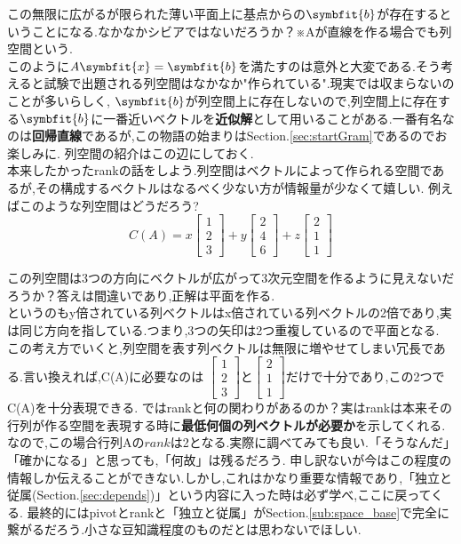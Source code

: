 この無限に広がるが限られた薄い平面上に基点からの$\symbfit{b}$が存在するということになる.なかなかシビアではないだろうか？※Aが直線を作る場合でも列空間という.\\
このように$A\symbfit{x}=\symbfit{b}$を満たすのは意外と大変である.そう考えると試験で出題される列空間はなかなか"作られている".現実では収まらないのことが多いらしく,
$\symbfit{b}$が列空間上に存在しないので,列空間上に存在する$\symbfit{b}$に一番近いベクトルを\textbf{近似解}として用いることがある.一番有名なのは\textbf{回帰直線}であるが,この物語の始まりはSection.\ref{sec:startGram}であるのでお楽しみに.
列空間の紹介はこの辺にしておく.\\

本来したかったrankの話をしよう.列空間はベクトルによって作られる空間であるが,その構成するベクトルはなるべく少ない方が情報量が少なくて嬉しい.
例えばこのような列空間はどうだろう?
\[
C(A)=
x
\begin{bmatrix}1 \\2 \\3\end{bmatrix}
+y
\begin{bmatrix}2 \\ 4 \\ 6\end{bmatrix}
+z
\begin{bmatrix}2 \\ 1 \\ 1\end{bmatrix}
\]

この列空間は3つの方向にベクトルが広がって3次元空間を作るように見えないだろうか？答えは間違いであり,正解は平面を作る.\\
というのもy倍されている列ベクトルはx倍されている列ベクトルの2倍であり,実は同じ方向を指している.つまり,3つの矢印は2つ重複しているので平面となる.
この考え方でいくと,列空間を表す列ベクトルは無限に増やせてしまい冗長である.言い換えれば,C(A)に必要なのは
$\begin{bmatrix}1 \\ 2\\ 3\end{bmatrix}$と$\begin{bmatrix}2 \\ 1\\ 1\end{bmatrix}$だけで十分であり,この2つでC(A)を十分表現できる.
ではrankと何の関わりがあるのか？実はrankは本来その行列が作る空間を表現する時に\textbf{最低何個の列ベクトルが必要か}を示してくれる.なので,この場合行列Aの$rank$は2となる.実際に調べてみても良い.「そうなんだ」「確かになる」と思っても,「何故」は残るだろう.
申し訳ないが今はこの程度の情報しか伝えることができない.しかし,これはかなり重要な情報であり,「独立と従属(Section.\ref{sec:depends})」という内容に入った時は必ず学べ,ここに戻ってくる.
最終的にはpivotとrankと「独立と従属」がSection.\ref{sub:space_base}で完全に繋がるだろう.小さな豆知識程度のものだとは思わないでほしい.
\newpage

